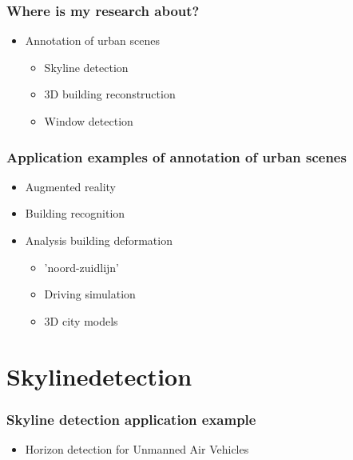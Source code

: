 \documentclass{beamer}
\begin{document}
\frame
{
	\frametitle{Where is my research about?}
	\begin{itemize}
	\item <+-| alert@+> {Annotation of urban scenes}
		\begin{itemize}
			\item <+-| alert@+> Skyline detection
			\item <+-| alert@+> 3D building reconstruction
			\item <+-| alert@+> Window detection
		\end{itemize}
	\end{itemize}

}

\frame
{
	\frametitle{Application examples of annotation of urban scenes}
	\begin{itemize}
		\item <+-| alert@+> Augmented reality
		\item <+-| alert@+> Building recognition
		\item <+-| alert@+> Analysis building deformation
		\begin{itemize}
			\item <+-| alert@+> 	'noord-zuidlijn'
		\item <+-| alert@+> Driving simulation
		\item <+-| alert@+> 3D city models
		\end{itemize}
	\end{itemize}
}

\frame
{
}

\frame
{
}

\frame
{
}

\frame
{
}

\section{Skylinedetection}
\frame
{
	\frametitle{Skyline detection application example}
	\begin{itemize}
		\item <+-| alert@+> Horizon detection for Unmanned Air Vehicles
	\end{itemize}
}
\end{document}
